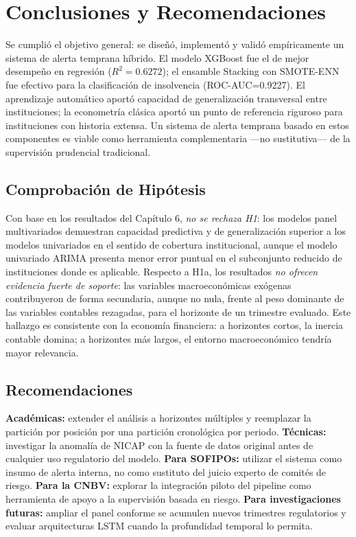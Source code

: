 \chapter{Conclusiones y Recomendaciones}

Se cumplió el objetivo general: se diseñó, implementó y validó empíricamente un sistema de alerta temprana híbrido. El modelo XGBoost fue el de mejor desempeño en regresión ($R^2=0.6272$); el ensamble Stacking con SMOTE-ENN fue efectivo para la clasificación de insolvencia (ROC-AUC=0.9227). El aprendizaje automático aportó capacidad de generalización transversal entre instituciones; la econometría clásica aportó un punto de referencia riguroso para instituciones con historia extensa. Un sistema de alerta temprana basado en estos componentes es viable como herramienta complementaria —no sustitutiva— de la supervisión prudencial tradicional.

\section{Comprobación de Hipótesis}
Con base en los resultados del Capítulo 6, \textit{no se rechaza H1}: los modelos panel multivariados demuestran capacidad predictiva y de generalización superior a los modelos univariados en el sentido de cobertura institucional, aunque el modelo univariado ARIMA presenta menor error puntual en el subconjunto reducido de instituciones donde es aplicable. Respecto a H1a, los resultados \textit{no ofrecen evidencia fuerte de soporte}: las variables macroeconómicas exógenas contribuyeron de forma secundaria, aunque no nula, frente al peso dominante de las variables contables rezagadas, para el horizonte de un trimestre evaluado. Este hallazgo es consistente con la economía financiera: a horizontes cortos, la inercia contable domina; a horizontes más largos, el entorno macroeconómico tendría mayor relevancia.

\section{Recomendaciones}
\textbf{Académicas:} extender el análisis a horizontes múltiples y reemplazar la partición por posición por una partición cronológica por periodo. \textbf{Técnicas:} investigar la anomalía de NICAP con la fuente de datos original antes de cualquier uso regulatorio del modelo. \textbf{Para SOFIPOs:} utilizar el sistema como insumo de alerta interna, no como sustituto del juicio experto de comités de riesgo. \textbf{Para la CNBV:} explorar la integración piloto del pipeline como herramienta de apoyo a la supervisión basada en riesgo. \textbf{Para investigaciones futuras:} ampliar el panel conforme se acumulen nuevos trimestres regulatorios y evaluar arquitecturas LSTM cuando la profundidad temporal lo permita.

